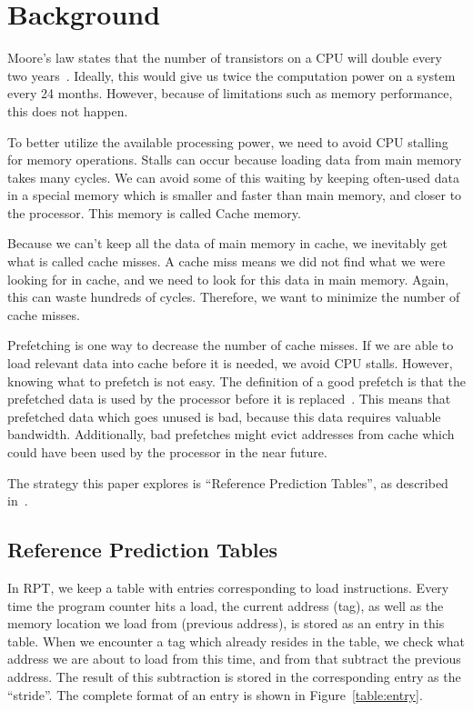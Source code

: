 \section{Background} %


Moore's law states that the number of transistors on a CPU will double
every two years~\cite{moore}. Ideally, this would give us twice the
computation power on a system every 24 months. However, because of
limitations such as memory performance, this does not happen.

To better utilize the available processing power, we need to avoid CPU
stalling for memory operations. Stalls can occur because loading data
from main memory takes many cycles. We can avoid some of this waiting
by keeping often-used data in a special memory which is smaller and
faster than main memory, and closer to the processor. This memory is
called Cache memory.

Because we can't keep all the data of main memory in cache, we
inevitably get what is called cache misses. A cache miss means we did
not find what we were looking for in cache, and we need to look for
this data in main memory. Again, this can waste hundreds of
cycles. Therefore, we want to minimize the number of cache misses.

Prefetching is one way to decrease the number of cache misses. If we
are able to load relevant data into cache before it is needed, we
avoid CPU stalls. However, knowing what to prefetch is not easy. The
definition of a good prefetch is that the prefetched data is used by
the processor before it is
replaced~\cite{srinivasan_davidson_tyson_2004}. This means that
prefetched data which goes unused is bad, because this data requires
valuable bandwidth. Additionally, bad prefetches might evict addresses
from cache which could have been used by the processor in the near
future.

The strategy this paper explores is ``Reference Prediction Tables'', as
described in~\cite{chen_baer_1995}.

\subsection{Reference Prediction Tables}

In RPT, we keep a table with entries corresponding to load
instructions. Every time the program counter hits a load, the current
address (tag), as well as the memory location we load from
(previous address), is stored as an entry in this table. When we encounter a
tag which already resides in the table, we check what address we are
about to load from this time, and from that subtract the previous
address. The result of this subtraction is stored in the corresponding
entry as the ``stride''. The complete format of an entry is shown in
Figure~\ref{table:entry}.

